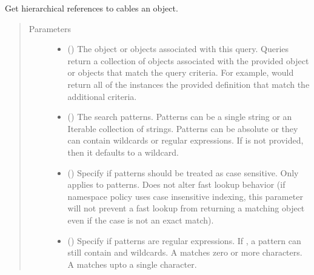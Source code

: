 \documentclass[letterpaper,10pt,english,openany,oneside]{sphinxmanual}
\begin{document}
\begin{fulllineitems}
\label{\detokenize{reference/classes/generated/spydrnet.get_hcables:spydrnet.get_hcables}}
Get hierarchical references to cables  an object.
\begin{quote}\begin{description}
\item[{Parameters}] \leavevmode\begin{itemize}
\item {} 
 () \textendash{} The object or objects associated with this query. Queries return a collection of objects associated with the
provided object or objects that match the query criteria. For example,  would
return all of the instances  the provided definition that match the additional criteria.

\item {} 
 () \textendash{} The search patterns. Patterns can be a single string or an Iterable collection of strings. Patterns can be
absolute or they can contain wildcards or regular expressions. If  is not provided, then it defaults
to a wildcard.

\item {} 
 () \textendash{} Specify if patterns should be treated as case sensitive. Only applies to patterns. Does not alter fast lookup
behavior (if namespace policy uses case insensitive indexing, this parameter will not prevent a fast lookup
from returning a matching object even if the case is not an exact match).

\item {} 
 () \textendash{} Specify if patterns are regular expressions. If , a pattern can still contain \sphinxtitleref{*} and  wildcards. A
\sphinxtitleref{*} matches zero or more characters. A  matches upto a single character.


\end{itemize}
\end{description}
\end{quote}
\end{fulllineitems}
\end{document}
